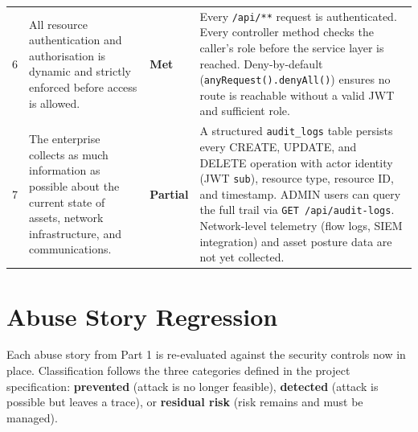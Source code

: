\documentclass[12pt,a4paper]{report}
\begin{document}
\begin{longtable}{S{0.4cm} S{4.2cm} S{2.2cm} S{7.0cm}}
6 & All resource authentication and authorisation is dynamic and strictly enforced before access is allowed. &
  \textbf{Met} &
  Every \texttt{/api/**} request is authenticated. Every controller method checks the caller's role before the service layer is reached. Deny-by-default (\texttt{anyRequest().denyAll()}) ensures no route is reachable without a valid JWT and sufficient role. \\[6pt]

7 & The enterprise collects as much information as possible about the current state of assets, network infrastructure, and communications. &
  \textbf{Partial} &
  A structured \texttt{audit\_logs} table persists every CREATE, UPDATE, and DELETE
  operation with actor identity (JWT \texttt{sub}), resource type, resource ID, and
  timestamp. ADMIN users can query the full trail via \texttt{GET /api/audit-logs}.
  Network-level telemetry (flow logs, SIEM integration) and asset posture data are not
  yet collected. \\
\end{longtable}

\section{Abuse Story Regression}

Each abuse story from Part 1 is re-evaluated against the security controls now in place.
Classification follows the three categories defined in the project specification:
\textbf{prevented} (attack is no longer feasible), \textbf{detected} (attack is possible
but leaves a trace), or \textbf{residual risk} (risk remains and must be managed).
\end{document}
